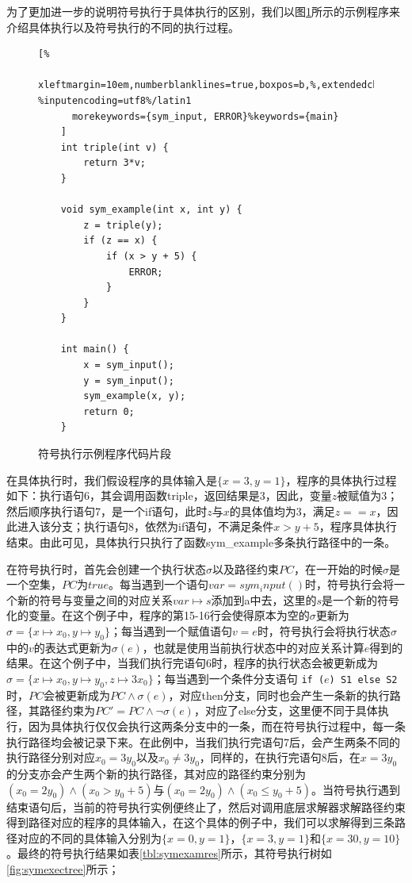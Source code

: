 为了更加进一步的说明符号执行于具体执行的区别，我们以图\ref{lst:symexeccode}所示的示例程序来介绍具体执行以及符号执行的不同的执行过程。
\begin{figure}[thbp]
    \begin{lstlisting}[%
      xleftmargin=10em,numberblanklines=true,boxpos=b,%,extendedchars=\true, %inputencoding=utf8%/latin1
      morekeywords={sym_input, ERROR}%keywords={main}
    ]
    int triple(int v) {
        return 3*v;
    }

    void sym_example(int x, int y) {
        z = triple(y);
        if (z == x) {
            if (x > y + 5) {
                ERROR;
            }
        }
    }

    int main() {
        x = sym_input();
        y = sym_input();
        sym_example(x, y);
        return 0;
    }
    \end{lstlisting}
    \caption{符号执行示例程序代码片段}
    \label{lst:symexeccode}
\end{figure}

在具体执行时，我们假设程序的具体输入是$\{x=3,y=1\}$，程序的具体执行过程如下：执行语句6，其会调用函数triple，返回结果是3，因此，变量$z$被赋值为3；然后顺序执行语句7，是一个if语句，此时$z$与$x$的具体值均为3，满足$z==x$，因此进入该分支；执行语句8，依然为if语句，不满足条件$x>y+5$，程序具体执行结束。由此可见，具体执行只执行了函数sym\_example多条执行路径中的一条。

在符号执行时，首先会创建一个执行状态$\sigma$以及路径约束$PC$，在一开始的时候$\sigma$是一个空集，$PC$为$true$。每当遇到一个语句$var = sym_input()$时，符号执行会将一个新的符号与变量之间的对应关系$var \mapsto s$添加到a中去，这里的$s$是一个新的符号化的变量。在这个例子中，程序的第15-16行会使得原本为空的$\sigma$更新为$\sigma = \{x \mapsto x_0, y \mapsto y_0\}$；每当遇到一个赋值语句$v = e$时，符号执行会将执行状态$\sigma$中的$v$的表达式更新为$\sigma(e)$，也就是使用当前执行状态中的对应关系计算$e$得到的结果。在这个例子中，当我们执行完语句6时，程序的执行状态会被更新成为$\sigma = \{x \mapsto x_0, y \mapsto y_0, z \mapsto 3x_0\}$；每当遇到一个条件分支语句 \texttt{if (}$e$\texttt{) S1 else S2}时，$PC$会被更新成为$PC\wedge\sigma(e)$，对应then分支，同时也会产生一条新的执行路径，其路径约束为$PC'=PC\wedge\neg\sigma(e)$，对应了else分支，这里便不同于具体执行，因为具体执行仅仅会执行这两条分支中的一条，而在符号执行过程中，每一条执行路径均会被记录下来。在此例中，当我们执行完语句7后，会产生两条不同的执行路径分别对应$x_0 = 3y_0$以及$x_0 \neq 3y_0$，同样的，在执行完语句8后，在$x=3y_0$的分支亦会产生两个新的执行路径，其对应的路径约束分别为$(x_0 = 2y_0) \wedge (x_0 > y_0 + 5)$与$(x_0 = 2y_0) \wedge (x_0 \leq y_0 + 5)$。当符号执行遇到结束语句后，当前的符号执行实例便终止了，然后对调用底层求解器求解路径约束得到路径对应的程序的具体输入，在这个具体的例子中，我们可以求解得到三条路径对应的不同的具体输入分别为$\{x = 0,y = 1\}$，$\{x = 3,y = 1\}$和$\{x = 30, y = 10\}$。最终的符号执行结果如表\ref{tbl:symexamres}所示，其符号执行树如\ref{fig:symexectree}所示；

